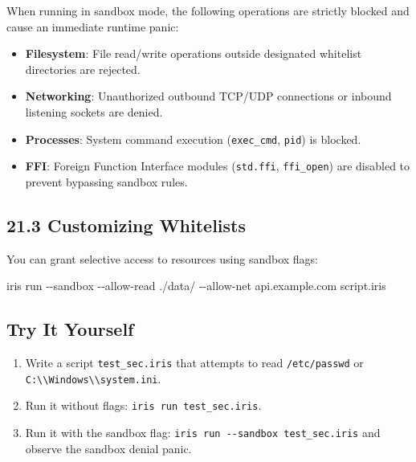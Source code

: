 \documentclass[
  english,
]{book}
\newenvironment{Shaded}{\begin{snugshade}}{\end{snugshade}}
\newcommand{\AttributeTok}[1]{\textcolor[rgb]{0.83,0.83,0.83}{#1}}
\newcommand{\ExtensionTok}[1]{\textcolor[rgb]{0.83,0.83,0.83}{#1}}
\newcommand{\NormalTok}[1]{\textcolor[rgb]{0.83,0.83,0.83}{#1}}
\providecommand{\tightlist}{%
  \setlength{\itemsep}{0pt}\setlength{\parskip}{0pt}}
\begin{document}
When running in sandbox mode, the following operations are strictly
blocked and cause an immediate runtime panic:

\begin{itemize}
\tightlist
\item
  \textbf{Filesystem}: File read/write operations outside designated
  whitelist directories are rejected.
\item
  \textbf{Networking}: Unauthorized outbound TCP/UDP connections or
  inbound listening sockets are denied.
\item
  \textbf{Processes}: System command execution (\texttt{exec\_cmd},
  \texttt{pid}) is blocked.
\item
  \textbf{FFI}: Foreign Function Interface modules (\texttt{std.ffi},
  \texttt{ffi\_open}) are disabled to prevent bypassing sandbox rules.
\end{itemize}

\subsection{21.3 Customizing Whitelists}\label{customizing-whitelists}

You can grant selective access to resources using sandbox flags:

\begin{Shaded}
\begin{Highlighting}[]
\ExtensionTok{iris}\NormalTok{ run }\AttributeTok{{-}{-}sandbox} \AttributeTok{{-}{-}allow{-}read}\NormalTok{ ./data/ }\AttributeTok{{-}{-}allow{-}net}\NormalTok{ api.example.com script.iris}
\end{Highlighting}
\end{Shaded}

\subsection{Try It Yourself}\label{try-it-yourself-20}

\begin{enumerate}
\def\labelenumi{\arabic{enumi}.}
\tightlist
\item
  Write a script \texttt{test\_sec.iris} that attempts to read
  \texttt{/etc/passwd} or
  \texttt{C:\textbackslash{}\textbackslash{}Windows\textbackslash{}\textbackslash{}system.ini}.
\item
  Run it without flags: \texttt{iris\ run\ test\_sec.iris}.
\item
  Run it with the sandbox flag:
  \texttt{iris\ run\ -\/-sandbox\ test\_sec.iris} and observe the
  sandbox denial panic.
\end{enumerate}
\end{document}
